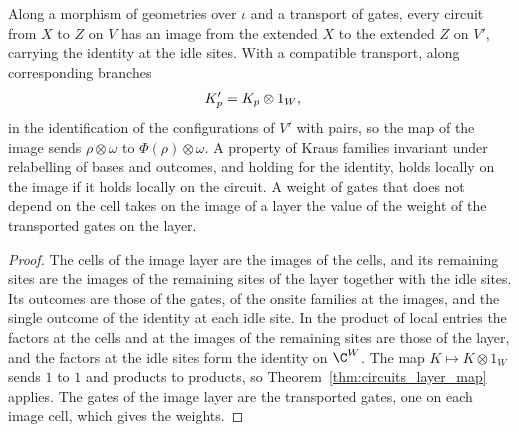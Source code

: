 \begin{theorem}
    \label{thm:circuits_map_sites}
    \leanok
    Along a morphism of geometries over $\iota$ and a transport of gates, every
    circuit from $X$ to $Z$ on $V$ has an image from the extended $X$ to the
    extended $Z$ on $V'$, carrying the identity at the idle sites. With a compatible
    transport, along corresponding branches
    \begin{align}
        K'_p&=K_p\otimes1_{W},
        \notag
    \end{align}
    in the identification of the configurations of $V'$ with pairs, so the map of the
    image sends $\rho\otimes\omega$ to $\Phi(\rho)\otimes\omega$. A property of
    Kraus families invariant under relabelling of bases and outcomes, and holding for
    the identity, holds locally on the image if it holds locally on the circuit. A
    weight of gates that does not depend on the cell takes on the image of a layer
    the value of the weight of the transported gates on the layer.
\end{theorem}
\begin{proof}\leanok
    The cells of the image layer are the images of the cells, and its remaining sites
    are the images of the remaining sites of the layer together with the idle sites.
    Its outcomes are those of the gates, of the onsite families at the images, and
    the single outcome of the identity at each idle site. In the product of local
    entries the factors at the cells and at the images of the remaining sites are
    those of the layer, and the factors at the idle sites form the identity on
    $\C^{W}$. The map $K\mapsto K\otimes1_W$ sends $1$ to $1$ and products to
    products, so Theorem~\ref{thm:circuits_layer_map} applies. The gates of the image
    layer are the transported gates, one on each image cell, which gives the weights.
\end{proof}

